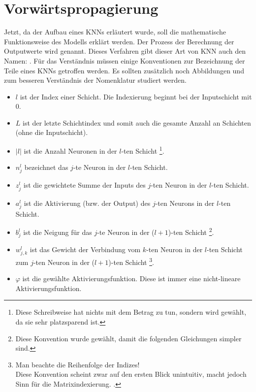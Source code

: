 \section{Vorwärtspropagierung}\label{sec:forward}
Jetzt, da der Aufbau eines KNNs erläutert wurde, soll die mathematische Funktionsweise
des Modells erklärt werden. Der Prozess der Berechnung der Outputwerte wird
 genannt. Dieses Verfahren gibt dieser Art von KNN auch den
Namen: . Für das Verständnis müssen einige Konventionen zur
Bezeichnung der Teile eines KNNs getroffen werden. Es sollten zusätzlich noch
Abbildungen  und  zum besseren
Verständnis der Nomenklatur studiert werden.
\begin{itemize}
\item{$l$ ist der Index einer Schicht. Die Indexierung beginnt bei der
    Inputschicht mit 0.}
\item{$L$ ist der letzte Schichtindex und somit auch die gesamte Anzahl an
    Schichten (ohne die Inputschicht).}
\item{$|l|$ ist die Anzahl Neuronen in der $l$-ten Schicht%
    \footnote{
      Diese Schreibweise hat nichts mit dem Betrag zu tun, sondern wird
      gewählt, da sie sehr platzsparend ist.
    }.
  }
\item{$n_j^l$ bezeichnet das $j$-te Neuron in der $l$-ten Schicht.}
\item{$z_j^l$ ist die gewichtete Summe der Inputs des $j$-ten Neuron in der $l$-ten Schicht.}
\item{$a_j^l$ ist die Aktivierung (bzw. der Output) des $j$-ten Neurons in der $l$-ten Schicht.}
\item{$b_j^l$ ist die Neigung für das $j$-te Neuron in der ($l+1$)-ten Schicht%
    \footnote{
      Diese Konvention wurde gewählt, damit die folgenden Gleichungen simpler sind.
    }.
  }
\item{$w_{j,k}^l$ ist das Gewicht der Verbindung vom $k$-ten Neuron
    in der $l$-ten Schicht zum $j$-ten Neuron in der ($l+1$)-ten Schicht%
    \footnote{
      Man beachte die Reihenfolge der Indizes!\\
      Diese Konvention scheint zwar auf den ersten Blick unintuitiv, macht jedoch
      Sinn für die Matrixindexierung.
      .
    }.
  }
\item{$\varphi$ ist die gewählte Aktivierungsfunktion. Diese ist immer eine
    nicht-lineare Aktivierungsfunktion.}
\end{itemize}

